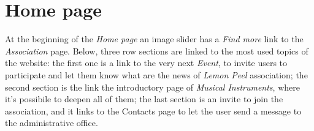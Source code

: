 \documentclass[../../DD.tex]{subfiles}
\begin{document}
\section{Home page}
	At the beginning of the \textit{Home page} an image slider has a \textit{Find more} link to the \textit{Association} page. Below, three row sections are linked to the most used topics of the website: the first one is a link to the very next \textit{Event}, to invite users to participate and let them know what are the news of \textit{Lemon Peel} association; the second section is the link the introductory page of \textit{Musical Instruments}, where it's possibile to deepen all of them; the last section is an invite to join the association, and it links to the Contacts page to let the user send a message to the administrative office.
	\newline
\end{document}
